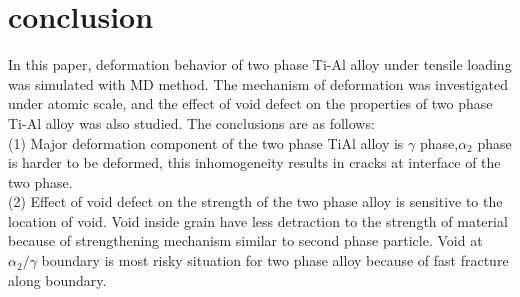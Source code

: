 \documentclass[Unknown,article,submit,moreauthors,pdftex,10pt,a4paper]{Definitions/mdpi}
\begin{document}
\section{conclusion}
In this paper, deformation behavior of two phase Ti-Al alloy under tensile loading was simulated with MD method. The mechanism of deformation was investigated under atomic scale, and the effect of void defect on the properties of two phase Ti-Al alloy was also studied.  The conclusions are as follows:\\
(1) Major deformation component of the two phase TiAl alloy is $\gamma$ phase,$\alpha_2$ phase is harder to be deformed, this inhomogeneity results in cracks at interface of the two phase. \\
(2) Effect of  void defect on the strength of the two phase alloy is sensitive to the location of  void. Void inside grain have less detraction to the strength of material because of strengthening mechanism similar to second phase particle. Void at $\alpha_2 / \gamma$ boundary is most risky situation for two phase alloy because of fast fracture along boundary.


\end{document}
